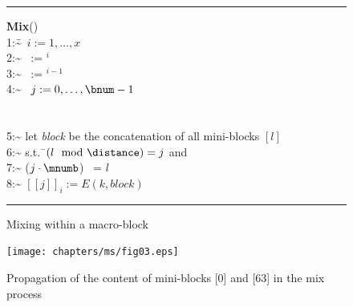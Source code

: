 \begin{figure}[!t]
\begin{scriptsize}
\hrule          %
\vspace{0.12cm}
\begin{tabbing}
{\bf Mix}(\macroblock{})\\   
\num{1:~}\= \myfor\ $i:= 1, \ldots, x$  \\
\num{2:~}\2 \spanna\ := \mnumb$^i$  \\
\num{3:~}\2 \distance\ := \mnumb$^{i -1}$ \\
\num{4:~}\2 \myfor\ $j:= 0, \ldots, \bnum -1$  \\
             \3 \\
             \3 \\
\num{5:~}\3 let \= {\em block} be the concatenation of all mini-blocks $[l]$\\
\num{6:~}\4 s.t.\= \ $(l\mod\distance) = j$ and  \\
\num{7:~}\5 ($j \cdot \mnumb$) \mydiv \spanna\ = $l$ \mydiv \spanna\\
\num{8:~}\3 $[[j]]_i := E(k,block)$ 
\end{tabbing}
\vspace{-0.3cm}
\hrule
\end{scriptsize}
\caption{\label{ms:fig:encrypt}Mixing within a macro-block \macroblock{}}
\end{figure}

\begin{figure}[!t]
\begin{center}
{\texttt{[image: chapters/ms/fig03.eps]}}\\
\vspace*{-0.6cm}
\end{center}
\caption{\label{ms:fig:general}Propagation of the content of mini-blocks [0] and [63] in the mix process}
\end{figure}

